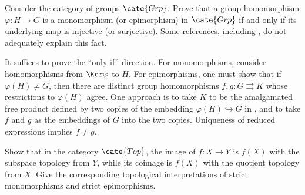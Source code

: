 \begin{Exercises}
	\item Consider the category of groups $\cate{Grp}$. Prove that a group
	homomorphism $\varphi:H\to G$ is a monomorphism (or epimorphism) in
	$\cate{Grp}$ if and only if its underlying map is injective (or
	surjective). Some references, including \cite{Li1}, do not adequately
	explain this fact.

	\begin{hint}
		It suffices to prove the ``only if'' direction. For monomorphisms,
		consider homomorphisms from $\Ker\varphi$ to $H$. For epimorphisms, one
		must show that if $\varphi(H)\ne G$, then there are distinct group
		homomorphisms $f,g:G\rightrightarrows K$ whose restrictions to
		$\varphi(H)$ agree. One approach is to take $K$ to be the amalgamated
		free product defined by two copies of the embedding
		$\varphi(H)\hookrightarrow G$ in \cite[Definition 4.8.5]{Li1}, and to
		take $f$ and $g$ as the embeddings of $G$ into the two copies. Uniqueness
		of reduced expressions \cite[Lemma 4.8.7]{Li1} implies $f\ne g$.
	\end{hint}

	\item Show that in the category $\cate{Top}$, the image of $f:X\to Y$ is
	$f(X)$ with the subspace topology from $Y$, while its coimage is $f(X)$
	with the quotient topology from $X$. Give the corresponding topological
	interpretations of strict monomorphisms and strict epimorphisms.


\end{Exercises}
